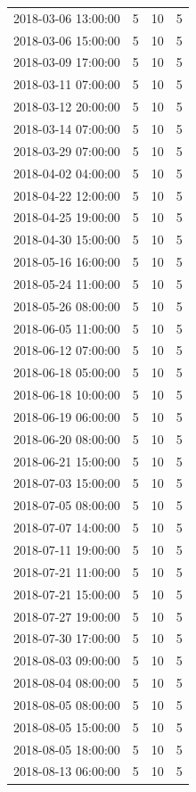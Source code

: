 \begin{tabular}{lrrr}
2018-03-06 13:00:00 & 5 & 10 & 5 \\
2018-03-06 15:00:00 & 5 & 10 & 5 \\
2018-03-09 17:00:00 & 5 & 10 & 5 \\
2018-03-11 07:00:00 & 5 & 10 & 5 \\
2018-03-12 20:00:00 & 5 & 10 & 5 \\
2018-03-14 07:00:00 & 5 & 10 & 5 \\
2018-03-29 07:00:00 & 5 & 10 & 5 \\
2018-04-02 04:00:00 & 5 & 10 & 5 \\
2018-04-22 12:00:00 & 5 & 10 & 5 \\
2018-04-25 19:00:00 & 5 & 10 & 5 \\
2018-04-30 15:00:00 & 5 & 10 & 5 \\
2018-05-16 16:00:00 & 5 & 10 & 5 \\
2018-05-24 11:00:00 & 5 & 10 & 5 \\
2018-05-26 08:00:00 & 5 & 10 & 5 \\
2018-06-05 11:00:00 & 5 & 10 & 5 \\
2018-06-12 07:00:00 & 5 & 10 & 5 \\
2018-06-18 05:00:00 & 5 & 10 & 5 \\
2018-06-18 10:00:00 & 5 & 10 & 5 \\
2018-06-19 06:00:00 & 5 & 10 & 5 \\
2018-06-20 08:00:00 & 5 & 10 & 5 \\
2018-06-21 15:00:00 & 5 & 10 & 5 \\
2018-07-03 15:00:00 & 5 & 10 & 5 \\
2018-07-05 08:00:00 & 5 & 10 & 5 \\
2018-07-07 14:00:00 & 5 & 10 & 5 \\
2018-07-11 19:00:00 & 5 & 10 & 5 \\
2018-07-21 11:00:00 & 5 & 10 & 5 \\
2018-07-21 15:00:00 & 5 & 10 & 5 \\
2018-07-27 19:00:00 & 5 & 10 & 5 \\
2018-07-30 17:00:00 & 5 & 10 & 5 \\
2018-08-03 09:00:00 & 5 & 10 & 5 \\
2018-08-04 08:00:00 & 5 & 10 & 5 \\
2018-08-05 08:00:00 & 5 & 10 & 5 \\
2018-08-05 15:00:00 & 5 & 10 & 5 \\
2018-08-05 18:00:00 & 5 & 10 & 5 \\
2018-08-13 06:00:00 & 5 & 10 & 5 \\

\end{tabular}
